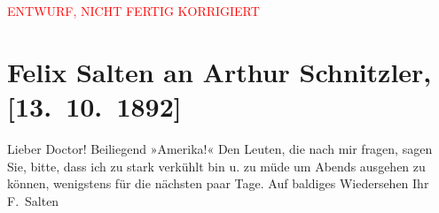 
\begin{center}
            \textcolor{red}{ENTWURF, NICHT FERTIG KORRIGIERT}
                      \end{center}
            
         \renewcommand{\erwaehnteOrte}{Orte: Wien}
         \renewcommand{\erwaehnteWerke}{Werke: Amerika}
               \section[Felix Salten an Arthur Schnitzler, {[}13. 10. 1892{]}]{ Felix Salten an Arthur Schnitzler, {[}13. 10. 1892{]}}\nopagebreak{}\rehead{ }\begin{ledgroupsized}[t]{13cm}\normalsize\beginnumbering \toendnotes[C]{\smallbreak\pagebreak[2]} 
\pstart
           \noindent{}{\pb}Lieber Doctor! Beiliegend »Amerika!« Den
               Leuten, die nach mir fragen, sagen Sie, bitte, dass ich zu stark verkühlt bin u. zu
               müde um Abends ausgehen zu können, wenigstens für die nächsten paar Tage. \pend
           \pstart
           Auf baldiges Wiedersehen \pend
           \pstart Ihr \spacefill\mbox{F. Salten}\pend{}
         
         \endnumbering{}\end{ledgroupsized}\begin{anhang}\end{anhang}\newcommand{\dateiname}{L03116}\newcommand{\titel}{Felix Salten an Arthur Schnitzler, [13. 10. 1892]}\newcommand{\editorInnen}{Martin Anton Müller und Laura Untner}
      